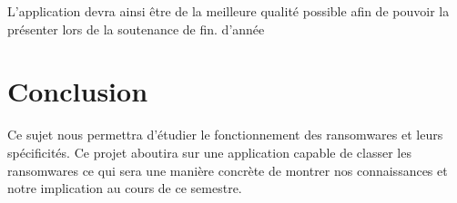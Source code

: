 \documentclass[a4paper, 12pt, twoside]{article}
\begin{document}
L'application devra ainsi être de la meilleure qualité possible afin de pouvoir la présenter lors de la soutenance de fin. d'année
\section{Conclusion}
Ce sujet nous permettra d'étudier le fonctionnement des ransomwares et leurs spécificités. Ce projet aboutira sur une application capable de classer les ransomwares ce qui sera une manière concrète de montrer nos connaissances et notre implication au cours de ce semestre.
\end{document}
